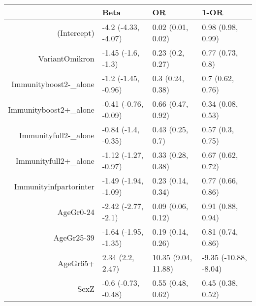 \begin{table}[ht]
\centering
\begin{tabular}{rlll}
  \hline
 & Beta & OR & 1-OR \\ 
  \hline
(Intercept) & -4.2 (-4.33, -4.07) & 0.02 (0.01, 0.02) & 0.98 (0.98, 0.99) \\ 
  VariantOmikron & -1.45 (-1.6, -1.3) & 0.23 (0.2, 0.27) & 0.77 (0.73, 0.8) \\ 
  Immunityboost2-\_alone & -1.2 (-1.45, -0.96) & 0.3 (0.24, 0.38) & 0.7 (0.62, 0.76) \\ 
  Immunityboost2+\_alone & -0.41 (-0.76, -0.09) & 0.66 (0.47, 0.92) & 0.34 (0.08, 0.53) \\ 
  Immunityfull2-\_alone & -0.84 (-1.4, -0.35) & 0.43 (0.25, 0.7) & 0.57 (0.3, 0.75) \\ 
  Immunityfull2+\_alone & -1.12 (-1.27, -0.97) & 0.33 (0.28, 0.38) & 0.67 (0.62, 0.72) \\ 
  Immunityinfpartorinter & -1.49 (-1.94, -1.09) & 0.23 (0.14, 0.34) & 0.77 (0.66, 0.86) \\ 
  AgeGr0-24 & -2.42 (-2.77, -2.1) & 0.09 (0.06, 0.12) & 0.91 (0.88, 0.94) \\ 
  AgeGr25-39 & -1.64 (-1.95, -1.35) & 0.19 (0.14, 0.26) & 0.81 (0.74, 0.86) \\ 
  AgeGr65+ & 2.34 (2.2, 2.47) & 10.35 (9.04, 11.88) & -9.35 (-10.88, -8.04) \\ 
  SexZ & -0.6 (-0.73, -0.48) & 0.55 (0.48, 0.62) & 0.45 (0.38, 0.52) \\ 
   \hline
\end{tabular}
\end{table}
